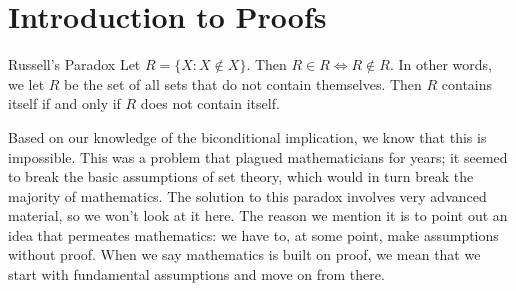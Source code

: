 \section{Introduction to Proofs}

\begin{theorem}{Russell's Paradox}
    Let $R=\{X : X\notin X\}$. Then $R\in R\iff R\notin R$. In other words, we let $R$ be the set of all sets that do not contain themselves. Then $R$ contains itself if and only if $R$ does not contain itself.
\end{theorem}
Based on our knowledge of the biconditional implication, we know that this is impossible. This was a problem that plagued mathematicians for years; it seemed to break the basic assumptions of set theory, which would in turn break the majority of mathematics. The solution to this paradox involves very advanced material, so we won't look at it here. The reason we mention it is to point out an idea that permeates mathematics: we have to, at some point, make assumptions without proof. When we say mathematics is built on proof, we mean that we start with fundamental assumptions and move on from there.
